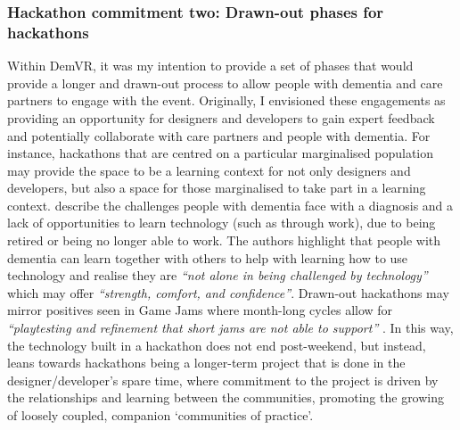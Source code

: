\subsubsection{Hackathon commitment two: Drawn-out phases for hackathons}
\label{DiscussionThree:CommitTwo}
Within DemVR, it was my intention to provide a set of phases that would provide a longer and drawn-out process to allow people with dementia and care partners to engage with the event. Originally, I envisioned these engagements as providing an opportunity for designers and developers to gain expert feedback and potentially collaborate with care partners and people with dementia. For instance, hackathons that are centred on a particular marginalised population may provide the space to be a learning context for not only designers and developers, but also a space for those marginalised to take part in a learning context. \cite{rosenberg2012persons} describe the challenges people with dementia face with a diagnosis and a lack of opportunities to learn technology (such as through work), due to being retired or being no longer able to work. The authors highlight that people with dementia can learn together with others to help with learning how to use technology and realise they are \textit{``not alone in being challenged by technology''} which may offer \textit{``strength, comfort, and confidence''}. Drawn-out hackathons may mirror positives seen in Game Jams where month-long cycles allow for \textit{``playtesting and refinement that short jams are not able to support''} \citep{faas2019jam}. In this way, the technology built in a hackathon does not end post-weekend, but instead, leans towards hackathons being a longer-term project that is done in the designer/developer’s spare time, where commitment to the project is driven by the relationships and learning between the communities, promoting the growing of loosely coupled, companion `communities of practice'.

